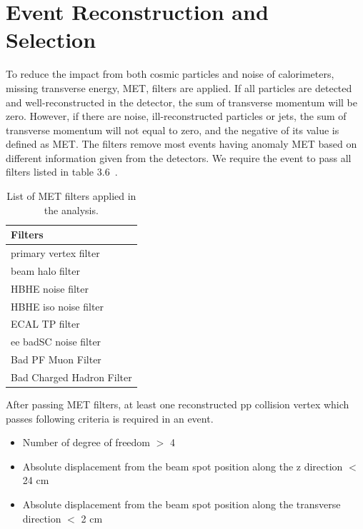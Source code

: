 \section{Event Reconstruction and Selection} \label{Event reconstruction and selection}
To reduce the impact from both cosmic particles and noise of calorimeters, missing transverse energy, MET, filters are applied.
If all particles are detected and well-reconstructed in the detector, the sum of transverse momentum will be zero. However, if there are noise, ill-reconstructed particles or jets, the sum of transverse momentum will not equal to zero, and the negative of its value is defined as MET.  
The filters remove most events having anomaly MET based on different information given from the detectors. We require the event to pass all filters listed in table 3.6~\citep{MissingETOptionalFiltersRun2}.  %
\begin{table}[h!]
  \begin{center}
    \begin{tabular}{l}
    Filters \\
    \hline
    primary vertex filter\\
    beam halo filter\\
    HBHE noise filter\\
    HBHE iso noise filter\\
    ECAL TP filter\\
    ee badSC noise filter\\
	Bad PF Muon Filter\\
	Bad Charged Hadron Filter\\ 
    \hline
    \end{tabular}
  \end{center}

  \caption{List of MET filters applied in the analysis.}
\end{table}

After passing MET filters, at least one reconstructed pp collision vertex which passes following criteria is required in an event.
\begin{itemize}[noitemsep]
\item Number of degree of freedom $>$ 4
\item Absolute displacement from the beam spot position along the z direction $<$ 24 cm
\item Absolute displacement from the beam spot position along the transverse direction $<$ 2 cm
\end{itemize}


